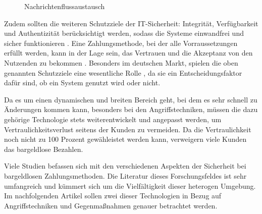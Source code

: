 \vfill
\begin{figure}[H]
    \caption{Nachrichtenflussaustausch \cite{refart:JTAS}}
    \label{fig:refart:JTAS_2}
\end{figure}
\vfill

Zudem sollten die weiteren Schutzziele der IT-Sicherheit: Integrität, Verfügbarkeit und Authentizität
berücksichtigt werden, sodass die Systeme einwandfrei und sicher funktionieren \cite{refip:GMPS}. 
Eine Zahlungsmethode, bei der alle Vorraussetzungen erfüllt werden, kann in der Lage sein, das Vertrauen 
und die Akzeptanz von den Nutzenden zu bekommen \cite{refart:HARE}. Besonders im deutschen Markt, spielen
die oben genannten Schutzziele eine wesentliche Rolle \cite{refip:DKAM}, da sie ein Entscheidungsfaktor 
dafür sind, ob ein System genutzt wird oder nicht.


Da es um einen dynamischen und breiten Bereich geht, bei dem es sehr schnell zu Änderungen kommen kann, 
besonders bei den Angriffstechniken, müssen die dazu gehörige \cite{refip:NYRS} Technologie stets 
weiterentwickelt und angepasst werden, um Vertraulichkeitsverlust seitens der Kunden zu vermeiden. 
Da die Vertraulichkeit noch nicht zu 100 Prozent gewähleistet werden kann, verweigern viele Kunden
das bargeldlose Bezahlen.

Viele Studien befassen sich mit den verschiedenen Aspekten der Sicherheit bei bargeldlosen Zahlungsmethoden.
Die Literatur dieses Forschungsfeldes ist sehr umfangreich und kümmert sich um die Vielfältigkeit 
dieser heterogen \cite{refip:GMPS} Umgebung. Im nachfolgenden Artikel sollen zwei dieser Technologien 
in Bezug auf Angriffstechniken und Gegenmaßnahmen genauer betrachtet werden.

